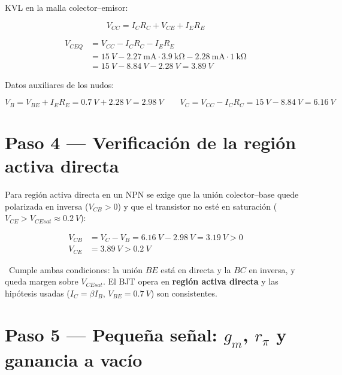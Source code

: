 \documentclass[11pt,a4paper]{article}
\begin{document}
KVL en la malla colector–emisor:

\begin{equation*}
  V_{CC} = I_C R_C + V_{CE} + I_E R_E
\end{equation*}

\begin{align*}
  V_{CEQ} &= V_{CC} - I_C R_C - I_E R_E\\
          &= \SI{15}{V} - \SI{2.27}{\milli\ampere}\cdot\SI{3.9}{\kilo\ohm}
             - \SI{2.28}{\milli\ampere}\cdot\SI{1}{\kilo\ohm}\\
          &= \SI{15}{V} - \SI{8.84}{V} - \SI{2.28}{V}
          = \boxed{\SI{3.89}{V}}
\end{align*}

Datos auxiliares de los nudos:

\begin{equation*}
  V_B = V_{BE} + I_E R_E = \SI{0.7}{V} + \SI{2.28}{V} = \SI{2.98}{V}
  \qquad
  V_C = V_{CC} - I_C R_C = \SI{15}{V} - \SI{8.84}{V} = \SI{6.16}{V}
\end{equation*}

\section{Paso 4 — Verificación de la región activa directa}

Para región activa directa en un NPN se exige que la unión colector–base quede
polarizada en inversa ($V_{CB} > 0$) y que el transistor no esté en saturación
($V_{CE} > V_{CEsat}\approx\SI{0.2}{V}$):

\begin{align*}
  V_{CB} &= V_C - V_B = \SI{6.16}{V} - \SI{2.98}{V} = \SI{3.19}{V} > 0\\
  V_{CE} &= \SI{3.89}{V} > \SI{0.2}{V}
\end{align*}

\begin{cajaRecuerda}
~Cumple ambas condiciones: la unión $BE$ está en directa y la
$BC$ en inversa, y queda margen sobre $V_{CEsat}$. El BJT opera en \textbf{región
activa directa} y las hipótesis usadas ($I_C=\beta I_B$, $V_{BE}=\SI{0.7}{V}$) son consistentes.
\end{cajaRecuerda}

\section{Paso 5 — Pequeña señal: $g_m$, $r_\pi$ y ganancia a vacío}
\end{document}
